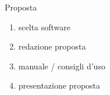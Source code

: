 \documentclass[compress,9pt]{beamer}
\newcommand{\sw}{\foreignlanguage{english}{software}\xspace}
\begin{document}
\begin{frame}
\begin{columns}
{\begin{block}{ Proposta}
  \begin{enumerate}
    \item scelta \sw
    \item redazione proposta
    \item manuale / consigli d'uso
    \item presentazione proposta
  \end{enumerate}
\end{block}
}
\end{columns}

\end{frame}
\end{document}
